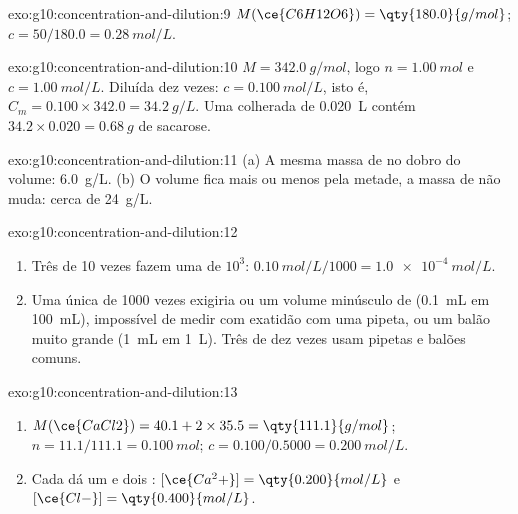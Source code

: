 \begin{solution}{exo:g10:concentration-and-dilution:9}
$M(\ce{C6H12O6}) = \qty{180.0}{g/mol}$; $c = 50 / 180.0 =
\qty{0.28}{mol/L}$.
\end{solution}

\begin{solution}{exo:g10:concentration-and-dilution:10}
$M = \qty{342.0}{g/mol}$, logo $n = \qty{1.00}{mol}$ e $c =
\qty{1.00}{mol/L}$. Diluída dez vezes: $c = \qty{0.100}{mol/L}$, isto é,
$C_m = 0.100 \times 342.0 = \qty{34.2}{g/L}$. Uma colherada de
\qty{0.020}{L} contém $34.2 \times 0.020 = \qty{0.68}{g}$ de sacarose.
\end{solution}

\begin{solution}{exo:g10:concentration-and-dilution:11}
(a) A mesma massa de  no dobro do volume: \qty{6.0}{g/L}.
(b) O volume fica mais ou menos pela metade, a massa de  não
muda: cerca de \qty{24}{g/L}.
\end{solution}

\begin{solution}{exo:g10:concentration-and-dilution:12}
\begin{enumerate}
  \item Três  de 10 vezes fazem uma  de $10^3$:
        $\qty{0.10}{mol/L} / 1000 = \qty{1.0e-4}{mol/L}$.
  \item Uma única  de 1000 vezes exigiria ou um volume minúsculo
        de  (\qty{0.1}{mL} em \qty{100}{mL}), impossível
        de medir com exatidão com uma pipeta, ou um balão muito grande
        (\qty{1}{mL} em \qty{1}{L}). Três  de dez vezes usam
        pipetas e balões comuns.
\end{enumerate}
\end{solution}

\begin{solution}{exo:g10:concentration-and-dilution:13}
\begin{enumerate}
  \item $M(\ce{CaCl2}) = 40.1 + 2 \times 35.5 = \qty{111.1}{g/mol}$;
        $n = 11.1 / 111.1 = \qty{0.100}{mol}$; $c = 0.100 / 0.5000 =
        \qty{0.200}{mol/L}$.
  \item Cada  dá um  e dois :
        $[\ce{Ca^2+}] = \qty{0.200}{mol/L}$ e $[\ce{Cl-}] =
        \qty{0.400}{mol/L}$.
\end{enumerate}
\end{solution}

